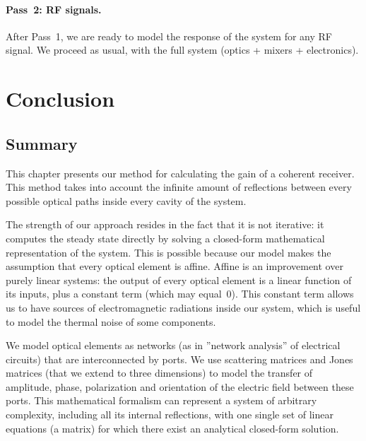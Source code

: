 \paragraph{Pass~2: RF signals.}
After Pass~1, we are ready to model the response of the system for any RF signal.
We proceed as usual, with the full system (optics + mixers + electronics).





\FloatBarrier
\section{Conclusion}




\subsection{Summary}
This chapter presents our method for calculating the gain of a coherent receiver.
This method takes into account the infinite amount of reflections between every possible optical paths inside every cavity of the system.

The strength of our approach resides in the fact that it is not iterative: it computes the steady state directly by solving a closed-form mathematical representation of the system.
This is possible because our model makes the assumption that every optical element is affine.
Affine is an improvement over purely linear systems: the output of every optical element is a linear function of its inputs, plus a constant term (which may equal~0).
This constant term allows us to have sources of electromagnetic radiations inside our system, which is useful to model the thermal noise of some components.

We model optical elements as networks (as in ''network analysis'' of electrical circuits) that are interconnected by ports.
We use scattering matrices and Jones matrices (that we extend to three dimensions) to model the transfer of amplitude, phase, polarization and orientation of the electric field between these ports.
This mathematical formalism can represent a system of arbitrary complexity, including all its internal reflections, with one single set of linear equations (a matrix) for which there exist an analytical closed-form solution.

